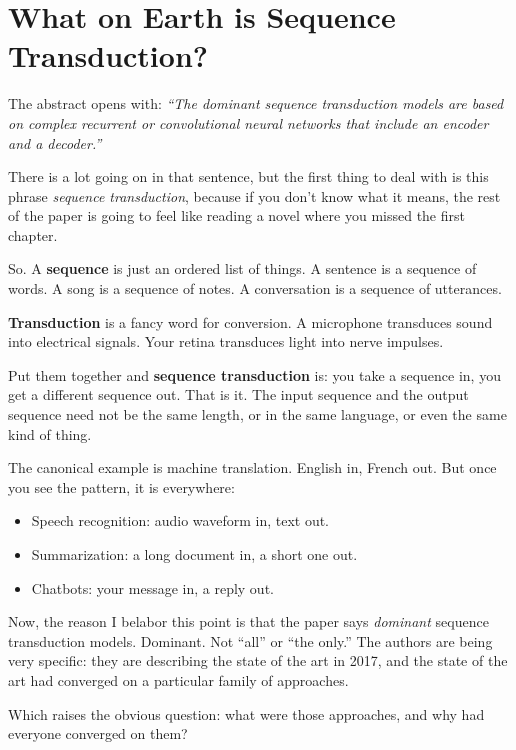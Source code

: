 \section{What on Earth is Sequence Transduction?}

The abstract opens with: \emph{``The dominant sequence transduction models are based on complex recurrent or convolutional neural networks that include an encoder and a decoder.''}

There is a lot going on in that sentence, but the first thing to deal with is this phrase \emph{sequence transduction}, because if you don't know what it means, the rest of the paper is going to feel like reading a novel where you missed the first chapter.

So.
A \textbf{sequence} is just an ordered list of things.
A sentence is a sequence of words.
A song is a sequence of notes.
A conversation is a sequence of utterances.

\textbf{Transduction} is a fancy word for conversion.
A microphone transduces sound into electrical signals.
Your retina transduces light into nerve impulses.

Put them together and \textbf{sequence transduction} is: you take a sequence in, you get a different sequence out.
That is it.
The input sequence and the output sequence need not be the same length, or in the same language, or even the same kind of thing.

The canonical example is machine translation.
English in, French out.
But once you see the pattern, it is everywhere:

\begin{itemize}
    \item Speech recognition: audio waveform in, text out.
    \item Summarization: a long document in, a short one out.
    \item Chatbots: your message in, a reply out.
\end{itemize}

Now, the reason I belabor this point is that the paper says \emph{dominant} sequence transduction models.
Dominant.
Not ``all'' or ``the only.''
The authors are being very specific: they are describing the state of the art in 2017, and the state of the art had converged on a particular family of approaches.

Which raises the obvious question: what were those approaches, and why had everyone converged on them?
